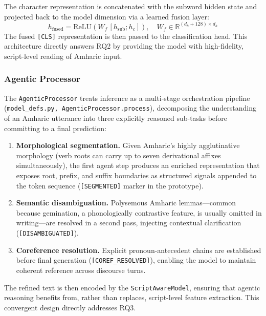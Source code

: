 The character representation is concatenated with the subword hidden state and projected back to
the model dimension via a learned fusion layer:
%
\begin{equation}
  h_{\text{fused}} = \text{ReLU}\!\left(W_f \, [h_{\text{sub}}; h_c]\right),
  \quad W_f \in \mathbb{R}^{(d_h + 128) \times d_h}
  \label{eq:fusion}
\end{equation}
%
The fused \texttt{[CLS]} representation is then passed to the classification head.  This
architecture directly answers RQ2 by providing the model with high-fidelity, script-level
reading of Amharic input.

\subsubsection{Agentic Processor}

The \texttt{AgenticProcessor} treats inference as a multi-stage orchestration pipeline
(\texttt{model\_defs.py, AgenticProcessor.process}), decomposing the understanding of an
Amharic utterance into three explicitly reasoned sub-tasks before committing to a final
prediction:

\begin{enumerate}
  \item \textbf{Morphological segmentation.}  Given Amharic's highly agglutinative morphology
        (verb roots can carry up to seven derivational affixes simultaneously), the first agent
        step produces an enriched representation that exposes root, prefix, and suffix
        boundaries as structured signals appended to the token sequence
        (\texttt{[SEGMENTED]} marker in the prototype).
  \item \textbf{Semantic disambiguation.}  Polysemous Amharic lemmas---common because
        gemination, a phonologically contrastive feature, is usually omitted in
        writing---are resolved in a second pass, injecting contextual clarification
        (\texttt{[DISAMBIGUATED]}).
  \item \textbf{Coreference resolution.}  Explicit pronoun-antecedent chains are established
        before final generation (\texttt{[COREF\_RESOLVED]}), enabling the model to maintain
        coherent reference across discourse turns.
\end{enumerate}

The refined text is then encoded by the \texttt{ScriptAwareModel}, ensuring that agentic
reasoning benefits from, rather than replaces, script-level feature extraction.  This convergent
design directly addresses RQ3.

